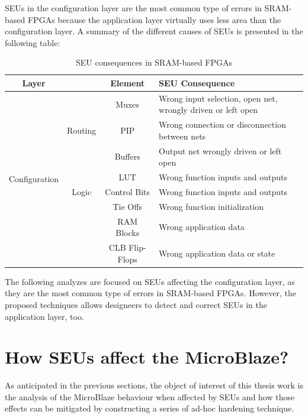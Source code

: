 SEUs in the configuration layer are the most common type of errors in SRAM-based FPGAs because the application layer virtually uses less area than the configuration layer. A summary of the different causes of SEUs is presented in the following table:

\begin{table}[H]
\centering
    \begin{tabular}{|cc|cp{6.2cm}|}
        \hline
        \textbf{Layer} & & \textbf{Element} & \textbf{SEU Consequence} \\
        \hline
        \multirow{12}{*}{Configuration}
        & & Muxes & Wrong input selection, open net, wrongly driven or left open\\
        \cline{3-4}
        & Routing & PIP & Wrong connection or disconnection between nets\\
        \cline{3-4}
        & & Buffers & Output net wrongly driven or left open\\
        \cline{2-4}
        & & LUT & Wrong function inputs and outputs \\
        \cline{3-4}
        & Logic & Control Bits & Wrong function inputs and outputs\\
        \cline{3-4}
        & & Tie Offs & Wrong function initialization\\
        \hline
        \multirow{2}{*}{Application}
        & & RAM Blocks & Wrong application data\\
        \cline{3-4}
        & & CLB Flip-Flops & Wrong application data or state\\
        \hline
    \end{tabular}
\caption{SEU consequences in SRAM-based FPGAs \cite{10.1145/1046192.1046212}}
\label{tab:conseq_fpgas_seu}
\end{table}

The following analyzes are focused on SEUs affecting the configuration layer, as they are the most common type of errors in SRAM-based FPGAs. However, the proposed techniques allows designeers to detect and correct SEUs in the application layer, too.

\section{How SEUs affect the MicroBlaze?}

As anticipated in the previous sections, the object of interest of this thesis work is the analysis of the MicroBlaze behaviour when affected by SEUs and how those effects can be mitigated by constructing a series of ad-hoc hardening technique. \bigskip

